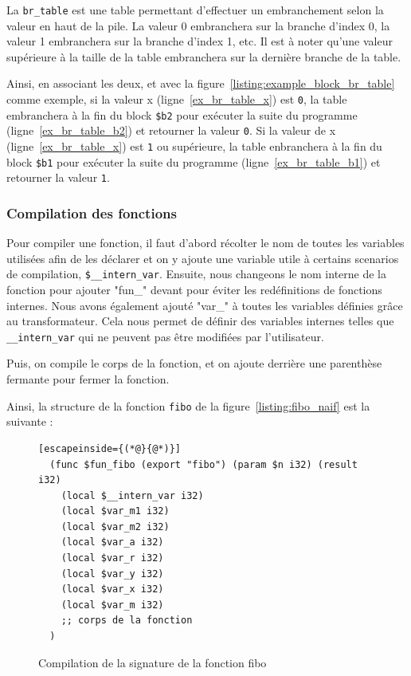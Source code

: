 \documentclass{rapportECL}
\begin{document}
La \verb|br_table| est une table permettant d'effectuer un embranchement selon la valeur en haut de la pile.
La valeur 0 embranchera sur la branche d'index 0, la valeur 1 embranchera sur la branche d'index 1, etc.
Il est à noter qu'une valeur supérieure à la taille de la table embranchera sur la dernière branche de la table.

Ainsi, en associant les deux, et avec la figure~\ref{listing:example_block_br_table} comme exemple, si la valeur x (ligne~\ref{ex_br_table_x})
est \verb|0|, la table embranchera à la fin du block \verb|$b2| pour exécuter la suite du programme (ligne~\ref{ex_br_table_b2}) et 
retourner la valeur \verb|0|. Si la valeur de x (ligne~\ref{ex_br_table_x}) est \verb|1| ou supérieure, la table enbranchera à la fin du 
block \verb|$b1| pour exécuter la suite du programme (ligne~\ref{ex_br_table_b1}) et retourner la valeur \verb|1|.

\subsubsection{Compilation des fonctions}

Pour compiler une fonction, il faut d'abord récolter le nom de toutes les variables utilisées afin de les 
déclarer et on y ajoute une variable utile à certains scenarios de compilation, \verb|$__intern_var|.
Ensuite, nous changeons le nom interne de la fonction pour ajouter "fun\_" devant pour éviter les 
redéfinitions de fonctions internes.
Nous avons également ajouté "var\_" à toutes les variables définies grâce au transformateur.
Cela nous permet de définir des variables internes telles que \verb|__intern_var| qui ne peuvent pas être modifiées par 
l'utilisateur.

Puis, on compile le corps de la fonction, et on ajoute derrière une parenthèse fermante pour fermer la fonction.

Ainsi, la structure de la fonction \verb|fibo| de la figure~\ref{listing:fibo_naif} est la suivante :
\begin{figure}[H]
	\begin{lstlisting}[escapeinside={(*@}{@*)}]
  (func $fun_fibo (export "fibo") (param $n i32) (result i32)
    (local $__intern_var i32)
    (local $var_m1 i32)
    (local $var_m2 i32)
    (local $var_a i32)
    (local $var_r i32)
    (local $var_y i32)
    (local $var_x i32)
    (local $var_m i32)
    ;; corps de la fonction
  )
	\end{lstlisting}
	\caption{Compilation de la signature de la fonction fibo}
	\label{listing:signature_fibo}
\end{figure}
\end{document}
